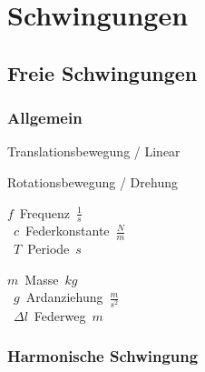 \section{Schwingungen}
\subsection{Freie Schwingungen}
\subsubsection{Allgemein}


\begin{center}
	\begin{minipage}{0.3\textwidth}
		Translationsbewegung / Linear \\
	\end{minipage}%
	\begin{minipage}{0.3\textwidth}
		Rotationsbewegung / Drehung \\
	\end{minipage}
\end{center}

\begin{center}
	\begin{minipage}{0.3\textwidth}
		\unit{$f$}{Frequenz}{$ \frac{1}{s} $} \\
		\unit{$c$}{Federkonstante}{$\frac{N}{m}$} \\
		\unit{$T$}{Periode}{$ s $} \\
	\end{minipage}%
	\begin{minipage}{0.3\textwidth}
		\unit{$m$}{Masse}{$ kg $} \\
		\unit{$g$}{Ardanziehung}{$ \frac{m}{s^2} $} \\
		\unit{$\Delta l$}{Federweg}{$ m $} \\
	\end{minipage}
\end{center}




\subsubsection{Harmonische Schwingung}

